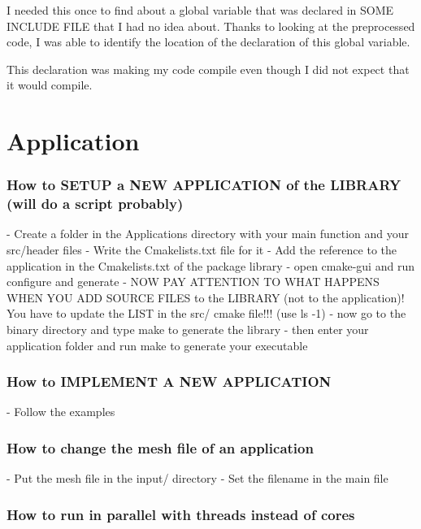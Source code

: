 \documentclass[10pt]{book}
\begin{document}
  I needed this once to find about a global variable that was declared in SOME INCLUDE FILE
  that I had no idea about. Thanks to looking at the preprocessed code, I was able to identify
  the location of the declaration of this global variable.
  
  This declaration was making my code compile even though I did not expect that it would compile.
  


\part{Application}



 \section{How to SETUP a NEW APPLICATION of the LIBRARY (will do a script probably)}

- Create a folder in the Applications directory with your main function and your src/header files
- Write the Cmakelists.txt file for it
- Add the reference to the application in the Cmakelists.txt of the package library
- open cmake-gui and run configure and generate
- NOW PAY ATTENTION TO WHAT HAPPENS WHEN YOU ADD SOURCE FILES to the LIBRARY (not to the application)! You have to update the LIST in the src/ cmake file!!! (use ls -1)
- now go to the binary directory and type make to generate the library
- then enter your application folder and run make to generate your executable

 \section{How to IMPLEMENT A NEW APPLICATION}

- Follow the examples

\section{How to change the mesh file of an application}

- Put the mesh file in the input/ directory
- Set the filename in the main file

 \section{How to run in parallel with threads instead of cores}
\end{document}
